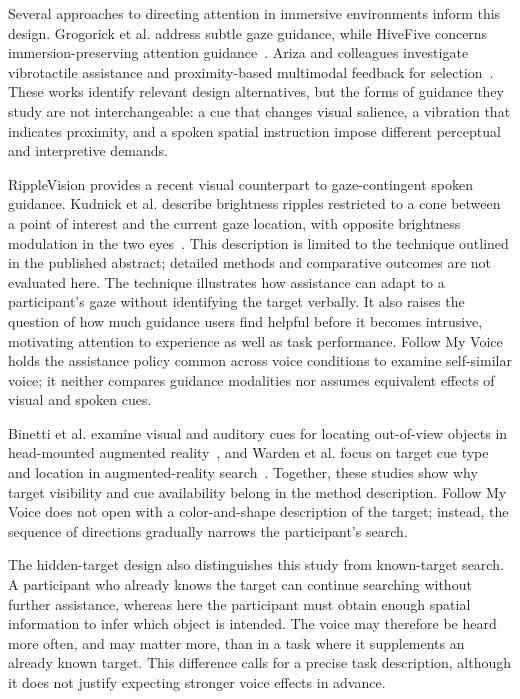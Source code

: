Several approaches to directing attention in immersive environments inform this design. Grogorick et al. address subtle gaze guidance, while HiveFive concerns immersion-preserving attention guidance~\cite{grogorick2017subtle,lange2020hivefive}. Ariza and colleagues investigate vibrotactile assistance and proximity-based multimodal feedback for selection~\cite{ariza2017vibrotactile,ariza2018proximity}. These works identify relevant design alternatives, but the forms of guidance they study are not interchangeable: a cue that changes visual salience, a vibration that indicates proximity, and a spoken spatial instruction impose different perceptual and interpretive demands.

RippleVision provides a recent visual counterpart to gaze-contingent spoken guidance. Kudnick et al. describe brightness ripples restricted to a cone between a point of interest and the current gaze location, with opposite brightness modulation in the two eyes~\cite{kudnick2026ripplevision}. This description is limited to the technique outlined in the published abstract; detailed methods and comparative outcomes are not evaluated here. The technique illustrates how assistance can adapt to a participant's gaze without identifying the target verbally. It also raises the question of how much guidance users find helpful before it becomes intrusive, motivating attention to experience as well as task performance. Follow My Voice holds the assistance policy common across voice conditions to examine self-similar voice; it neither compares guidance modalities nor assumes equivalent effects of visual and spoken cues.

Binetti et al. examine visual and auditory cues for locating out-of-view objects in head-mounted augmented reality~\cite{binetti2021outofview}, and Warden et al. focus on target cue type and location in augmented-reality search~\cite{warden2022visual}. Together, these studies show why target visibility and cue availability belong in the method description. Follow My Voice does not open with a color-and-shape description of the target; instead, the sequence of directions gradually narrows the participant's search.

The hidden-target design also distinguishes this study from known-target search. A participant who already knows the target can continue searching without further assistance, whereas here the participant must obtain enough spatial information to infer which object is intended. The voice may therefore be heard more often, and may matter more, than in a task where it supplements an already known target. This difference calls for a precise task description, although it does not justify expecting stronger voice effects in advance.


